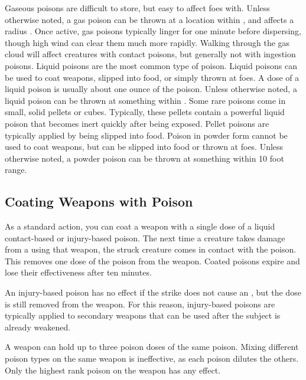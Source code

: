      Gaseous poisons are difficult to store, but easy to affect foes with.
    Unless otherwise noted, a gas poison can be thrown at a location within \shortrange, and affects a \tinyarea radius .
    Once active, gas poisons typically linger for one minute before dispersing, though high wind can clear them much more rapidly.
    Walking through the gas cloud will affect creatures with contact poisons, but generally not with ingestion poisons.
     Liquid poisons are the most common type of poison.
    Liquid poisons can be used to coat weapons, slipped into food, or simply thrown at foes.
    A dose of a liquid poison is usually about one ounce of the poison.
    Unless otherwise noted, a liquid poison can be thrown at something within \shortrange.
     Some rare poisons come in small, solid pellets or cubes.
    Typically, these pellets contain a powerful liquid poison that becomes inert quickly after being exposed.
    Pellet poisons are typically applied by being slipped into food.
     Poison in powder form cannot be used to coat weapons, but can be slipped into food or thrown at foes.
    Unless otherwise noted, a powder poison can be thrown at something within 10 foot range.

  \subsection{Coating Weapons with Poison}\label{Coating Weapons with Poison}
    As a standard action, you can coat a weapon with a single dose of a liquid contact-based or injury-based poison.
    The next time a creature takes damage from a  using that weapon, the struck creature comes in contact with the poison.
    This removes one dose of the poison from the weapon.
    Coated poisons expire and lose their effectiveness after ten minutes.

    An injury-based poison has no effect if the strike does not cause an , but the dose is still removed from the weapon.
    For this reason, injury-based poisons are typically applied to secondary weapons that can be used after the subject is already weakened.

    A weapon can hold up to three poison doses of the same poison.
    Mixing different poison types on the same weapon is ineffective, as each poison dilutes the others.
    Only the highest rank poison on the weapon has any effect.

